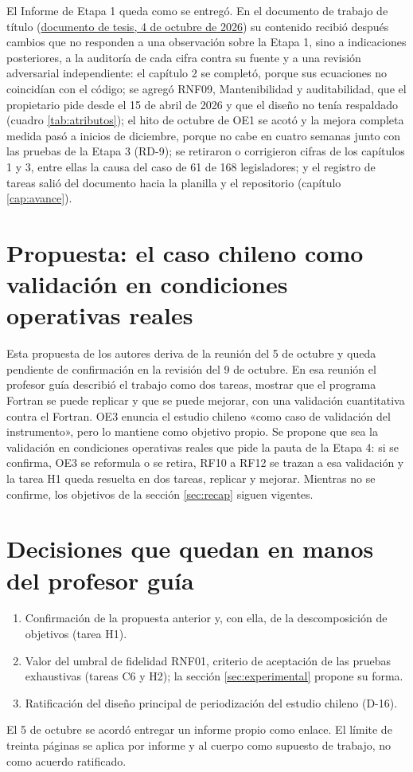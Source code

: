 El Informe de Etapa 1 queda como se entregó. En el documento de trabajo de título
(\href{run:../evidence/documento-tesis-2026-10-04.pdf}{documento de tesis, 4 de octubre de 2026}) su contenido recibió
después cambios que no responden a una observación sobre la Etapa 1, sino a indicaciones
posteriores, a la auditoría de cada cifra contra su fuente y a una revisión adversarial
independiente: el capítulo 2 se completó, porque sus ecuaciones no coincidían con el código; se
agregó RNF09, Mantenibilidad y auditabilidad, que el propietario pide desde el 15 de abril de
2026 y que el diseño no tenía respaldado (cuadro \ref{tab:atributos}); el hito de octubre de
OE1 se acotó y la mejora completa medida pasó a inicios de diciembre, porque no cabe en cuatro
semanas junto con las pruebas de la Etapa 3 (RD-9); se retiraron o corrigieron cifras de los
capítulos 1 y 3, entre ellas la causa del caso de 61 de 168 legisladores; y el registro de
tareas salió del documento hacia la planilla y el repositorio (capítulo \ref{cap:avance}).

\section{Propuesta: el caso chileno como validación en condiciones operativas reales}
\label{sec:propuesta-chile}

Esta propuesta de los autores deriva de la reunión del 5 de octubre y queda pendiente de
confirmación en la revisión del 9 de octubre. En esa reunión el profesor guía describió el
trabajo como dos tareas, mostrar que el programa Fortran se puede replicar y que se puede
mejorar, con una validación cuantitativa contra el Fortran. OE3 enuncia el estudio chileno
«como caso de validación del instrumento», pero lo mantiene como objetivo propio. Se propone
que sea la validación en condiciones operativas reales que pide la pauta de la Etapa 4: si se
confirma, OE3 se reformula o se retira, RF10 a RF12 se trazan a esa validación y la tarea H1
queda resuelta en dos tareas, replicar y mejorar. Mientras no se confirme, los objetivos de la
sección \ref{sec:recap} siguen vigentes.

\section{Decisiones que quedan en manos del profesor guía}
\label{sec:decisiones-guia}

\begin{enumerate}
  \item Confirmación de la propuesta anterior y, con ella, de la descomposición de objetivos
  (tarea H1).
  \item Valor del umbral de fidelidad RNF01, criterio de aceptación de las pruebas
  exhaustivas (tareas C6 y H2); la sección \ref{sec:experimental} propone su forma.
  \item Ratificación del diseño principal de periodización del estudio chileno (D-16).
\end{enumerate}

El 5 de octubre se acordó entregar un informe propio como enlace. El límite de treinta
páginas se aplica por informe y al cuerpo como supuesto de trabajo, no como acuerdo ratificado.
